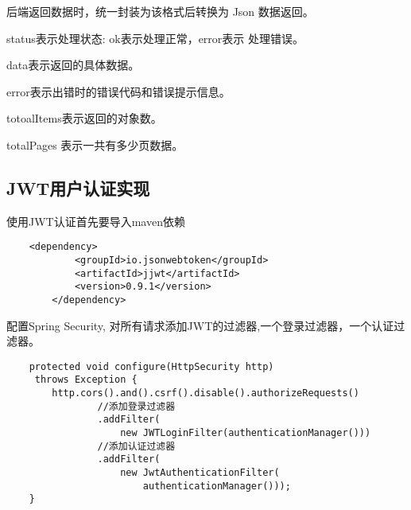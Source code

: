 后端返回数据时，统一封装为该格式后转换为 Json 数据返回。

status表示处理状态: ok表示处理正常，error表示
处理错误。

data表示返回的具体数据。

error表示出错时的错误代码和错误提示信息。

totoalItems表示返回的对象数。

totalPages 表示一共有多少页数据。

\subsection{JWT用户认证实现}
使用JWT认证首先要导入maven依赖

\begin{lstlisting}
    <dependency>
            <groupId>io.jsonwebtoken</groupId>
            <artifactId>jjwt</artifactId>
            <version>0.9.1</version>
        </dependency>
\end{lstlisting}

配置Spring Security, 对所有请求添加JWT的过滤器,一个登录过滤器，一个认证过滤器。

\begin{verbatim}
    protected void configure(HttpSecurity http)
     throws Exception {
        http.cors().and().csrf().disable().authorizeRequests()
                //添加登录过滤器
                .addFilter(
                    new JWTLoginFilter(authenticationManager()))
                //添加认证过滤器
                .addFilter(
                    new JwtAuthenticationFilter(
                        authenticationManager()));
    }
\end{verbatim}

